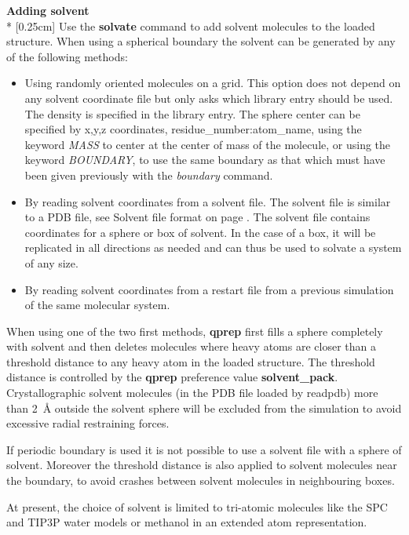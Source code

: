 \documentclass[a4paper,10pt]{article}
\begin{document}
\textbf{Adding solvent}\\*
[0.25cm] Use the \textbf{solvate} command  to add solvent molecules to
the loaded structure. When using  a spherical boundary the solvent can
be generated by any of the following methods:

\begin{itemize}
\item Using  randomly oriented molecules  on a grid. This  option does
  not  depend on  any  solvent  coordinate file  but  only asks  which
  library  entry should  be  used.  The density  is  specified in  the
  library  entry.   The  sphere  center  can  be  specified  by  x,y,z
  coordinates,    residue\_number:atom\_name,   using    the   keyword
  \textit{MASS} to  center at the center  of mass of the  molecule, or
  using the  keyword \textit{BOUNDARY},  to use  the same  boundary as
  that which must have been given previously with the \textit{boundary}
  command. 
\item By reading solvent coordinates  from a solvent file. The solvent
  file  is similar  to a  PDB file,  see Solvent  file format  on page
  \pageref{subsubsec:solvent_file_format}.  The solvent  file contains
  coordinates for a sphere or box of solvent. In the case of a box, it
  will be replicated in all directions  as needed and can thus be used
  to solvate a system of any size.
\item  By reading  solvent  coordinates  from a  restart  file from  a
  previous simulation of the same molecular system.
\end{itemize}

When using one of the two  first methods, \textbf{qprep} first fills a
sphere completely with solvent and  then deletes molecules where heavy
atoms are  closer than a threshold  distance to any heavy  atom in the
loaded  structure.  The  threshold   distance  is  controlled  by  the
\textbf{qprep}     preference      value     \textbf{solvent{\_}pack}.
Crystallographic solvent molecules (in the PDB file loaded by readpdb)
more than 2~{\AA} outside the solvent sphere will be excluded from the
simulation to avoid excessive radial restraining forces.

If periodic boundary is used it is  not possible to use a solvent file
with  a sphere  of solvent.  Moreover the  threshold distance  is also
applied  to solvent  molecules  near the  boundary,  to avoid  crashes
between solvent molecules in neighbouring boxes.

At present, the  choice of solvent is limited  to tri-atomic molecules
like the SPC\cite{Berendsen:1981} and TIP3P\cite{Jorgensen:1983} water
models or methanol in an extended atom representation.
\end{document}
